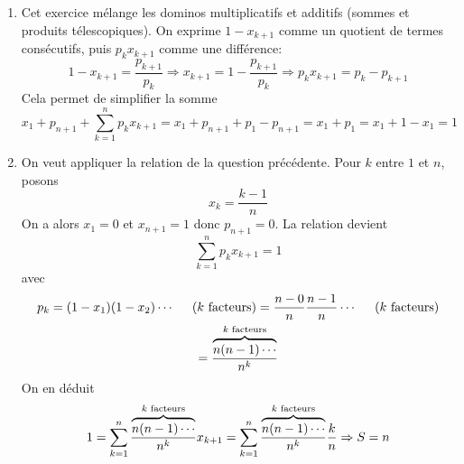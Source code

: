 \begin{enumerate}
  \item Cet exercice mélange les dominos multiplicatifs et additifs (sommes et produits télescopiques). On exprime $1 - x_{k+1}$ comme un quotient de termes consécutifs, puis $p_kx_{k+1}$ comme une différence:
\begin{displaymath}
1-x_{k+1} = \frac{p_{k+1}}{p_k}\Rightarrow x_{k+1} = 1-\frac{p_{k+1}}{p_k} \Rightarrow p_kx_{k+1} = p_k -p_{k+1}
\end{displaymath}
Cela permet de simplifier la somme
\begin{displaymath}
x_1+p_{n+1} + \sum_{k=1}^np_kx_{k+1} = x_1 + p_{n+1} + p_1 - p_{n+1}
= x_1 + p_1 =x_1 + 1-x_1 = 1
\end{displaymath}

  \item On veut appliquer la relation de la question précédente. Pour $k$ entre $1$ et $n$, posons
\begin{displaymath}
  x_k = \frac{k-1}{n}
\end{displaymath}
On a alors $x_1=0$ et $x_{n+1}=1$ donc $p_{n+1}=0$. La relation devient
\begin{displaymath}
  \sum_{k=1}^np_kx_{k+1} = 1
\end{displaymath}
avec 
\begin{multline*}
  p_k = (1-x_1)(1-x_2)\cdots \hspace{0.5cm} (k \text{ facteurs})
   = \frac{n-0}{n} \frac{n-1}{n} \cdots \hspace{0.5cm} (k \text{ facteurs}) \\
   = \frac{\overset{k \text{ facteurs}}{\overbrace{n(n-1)\cdots}}}{n^k}
\end{multline*}
On en déduit
\begin{displaymath}
1=\sum_{k=1}^n \frac{\overset{k \text{ facteurs}}{\overbrace{n(n-1)\cdots}}}{n^k}x_{k+1}
= \sum_{k=1}^n \frac{\overset{k \text{ facteurs}}{\overbrace{n(n-1)\cdots}}}{n^k}\frac{k}{n} \\
\Rightarrow 
S = n
\end{displaymath}

\end{enumerate}
